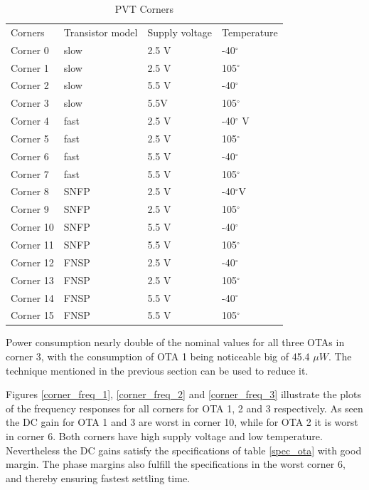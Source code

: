 \begin{table}[H]
\centering
\caption{PVT Corners}
\label{corners}
\begin{tabular}{l|l|l|l}
\hline
\multirow{1}{*}{Corners} & \multicolumn{1}{c|}{Transistor model} & \multicolumn{1}{c|}{Supply voltage} & \multicolumn{1}{c}{Temperature} \\\cline{1-4}
                       
            Corner 0       & slow & 2.5 V & -40$^\circ$\\
            Corner 1      & slow & 2.5 V & 105$^\circ$\\
            Corner 2      & slow & 5.5 V & -40$^\circ$\\
            Corner 3      & slow & 5.5V & 105$^\circ$\\
            Corner 4      & fast & 2.5 V & -40$^\circ$ V\\
            Corner 5      & fast & 2.5 V & 105$^\circ$\\
            Corner 6      & fast & 5.5 V &-40$^\circ$\\
            Corner 7      & fast & 5.5 V & 105$^\circ$\\
            Corner 8      & SNFP & 2.5 V & -40$^\circ$V\\
            Corner 9      & SNFP & 2.5 V & 105$^\circ$\\
            Corner 10      & SNFP & 5.5 V & -40$^\circ$\\
            Corner 11      & SNFP & 5.5 V & 105$^\circ$\\
            Corner 12      & FNSP & 2.5 V& -40$^\circ$\\
            Corner 13      & FNSP & 2.5 V & 105$^\circ$\\
            Corner 14      & FNSP & 5.5 V & -40$^\circ$\\
            Corner 15      & FNSP & 5.5 V & 105$^\circ$\\
            
\hline            
\end{tabular}
\end{table}

Power consumption nearly double of the nominal values for all three OTAs in corner 3, with the consumption of OTA 1 being noticeable big of 45.4 $\mu W$. The technique mentioned in the previous section can be used to reduce it.   

Figures \ref{corner_freq_1}, \ref{corner_freq_2} and \ref{corner_freq_3} illustrate the plots of the frequency responses for all corners for OTA 1, 2 and 3 respectively. As seen the DC gain for OTA 1 and 3 are worst in corner 10, while for OTA 2 it is worst in corner 6. Both corners have high supply voltage and low temperature. Nevertheless the DC gains satisfy the specifications of table \ref{spec_ota} with good margin. The phase margins also fulfill the specifications in the worst corner 6, and thereby ensuring fastest settling time.  

